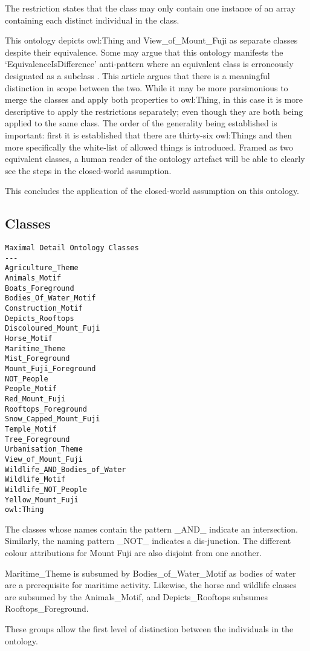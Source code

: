 \documentclass[titlepage,a4paper,12pt,oneside]{book}
\begin{document}
The restriction states that the class may only contain one instance of an array containing each distinct individual in the class.\par
This ontology depicts owl:Thing and View\_of\_Mount\_Fuji as separate classes despite their equivalence.
Some may argue that this ontology manifests the `EquivalenceIsDifference' anti-pattern where an equivalent class is erroneously designated as a subclass \cite[2]{antipatterns2009}.
This article argues that there is a meaningful distinction in scope between the two.
While it may be more parsimonious to merge the classes and apply both properties to owl:Thing, in this case it is more descriptive to apply the restrictions separately; even though they are both being applied to the same class.
The order of the generality being established is important: first it is established that there are thirty-six owl:Things and then more specifically the white-list of allowed things is introduced.
Framed as two equivalent classes, a human reader of the ontology artefact will be able to clearly see the steps in the closed-world assumption.\par
This concludes the application of the closed-world assumption on this ontology.
\subsection{Classes}
\begin{lstlisting}
Maximal Detail Ontology Classes
---
Agriculture_Theme
Animals_Motif
Boats_Foreground
Bodies_Of_Water_Motif
Construction_Motif
Depicts_Rooftops
Discoloured_Mount_Fuji
Horse_Motif
Maritime_Theme
Mist_Foreground
Mount_Fuji_Foreground
NOT_People
People_Motif
Red_Mount_Fuji
Rooftops_Foreground
Snow_Capped_Mount_Fuji
Temple_Motif
Tree_Foreground
Urbanisation_Theme
View_of_Mount_Fuji
Wildlife_AND_Bodies_of_Water
Wildlife_Motif
Wildlife_NOT_People
Yellow_Mount_Fuji
owl:Thing
\end{lstlisting}
The classes whose names contain the pattern \_AND\_ indicate an intersection.
Similarly, the naming pattern \_NOT\_ indicates a dis-junction.
The different colour attributions for Mount Fuji are also disjoint from one another.\par
Maritime\_Theme is subsumed by Bodies\_of\_Water\_Motif as bodies of water are a prerequisite for maritime activity.
Likewise, the horse and wildlife classes are subsumed by the Animals\_Motif, and Depicts\_Rooftops subsumes Rooftops\_Foreground.\par
These groups allow the first level of distinction between the individuals in the ontology.
\end{document}
